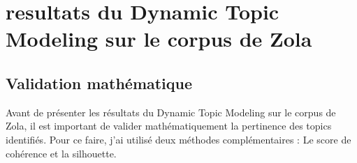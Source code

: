 \section{resultats du Dynamic Topic Modeling sur le corpus de Zola}

\subsection{Validation mathématique}

Avant de présenter les résultats du Dynamic Topic Modeling sur le corpus de Zola, il est important de valider mathématiquement la pertinence des topics identifiés. Pour ce faire, j'ai utilisé deux méthodes complémentaires : Le score de cohérence et la silhouette.